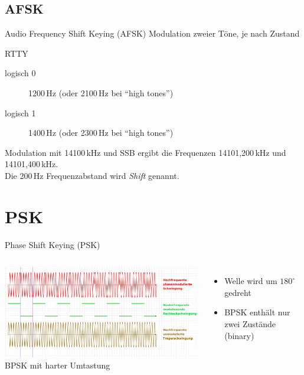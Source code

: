 \subsection{AFSK}
\begin{frame}{Audio Frequency Shift Keying (AFSK)}
  Modulation zweier Töne, je nach Zustand
  \begin{exampleblock}{RTTY}
    \begin{description}
      \item[logisch 0] 1200\,Hz (oder 2100\,Hz bei ``high tones'')
      \item[logisch 1] 1400\,Hz (oder 2300\,Hz bei ``high tones'')
    \end{description}
    Modulation mit 14100\,kHz und SSB ergibt die Frequenzen 14101,200\,kHz und 14101,400\,kHz.\\
    Die 200\,Hz Frequenzabstand wird \emph{Shift} genannt.
  \end{exampleblock}
\end{frame}

\section{PSK}
\begin{frame}{Phase Shift Keying (PSK)}
  \begin{columns}
    \includegraphics[width=\textwidth,height=.8\textheight,keepaspectratio]{a15/Phase_modulation_(PHM).png}\\
    {\tiny BPSK mit harter Umtastung \hyperlink{refs}{\cite{wm}}}
    \begin{itemize}
      \item Welle wird um $180^\circ$ gedreht
      \item BPSK enthält nur zwei Zustände (binary)
    \end{itemize}
  \end{columns}
\end{frame}

